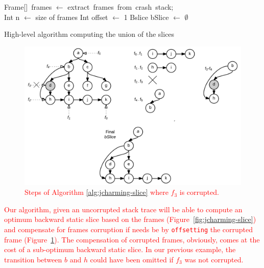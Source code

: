 \documentclass[times, doublespace]{smrauth}
\newcommand{\red}[1]{\textcolor{red}{#1}}
\begin{document}
{\vspace*{0.3cm}

\begin{algorithm}
 Frame[]~frames $\leftarrow$ extract~frames~from~crash~stack; \\
 Int n $\leftarrow$ size of frames\;
 Int offset $\leftarrow$ 1\;
 Bslice bSlice $\leftarrow$ $\emptyset$\;
\caption{High-level algorithm computing the union of the slices\label{alg:jcharming-slice}}
\end{algorithm}

\vspace*{0.3cm}


\begin{figure}
  \centering
    \includegraphics[scale=.20]{media/algo.png}
    \caption{\red{Steps of Algorithm \ref{alg:jcharming-slice} where $f_3$ is corrupted.}
    \label{fig:jcharming-algo}}
\end{figure}

\red{Our algorithm, given an uncorrupted stack trace will be able to compute an optimum backward static slice based on the frames (Figure~\ref{fig:jcharming-slice}) and compensate for frames corruption if needs be by \texttt{offsetting} the corrupted frame (Figure~\ref{fig:jcharming-algo}).
The compensation of corrupted frames, obviously, comes at the cost of a sub-optimum backward static slice.
In our previous example, the transition between $b$ and $h$ could have been omitted if $f_3$ was not corrupted.
}


}
\end{document}
